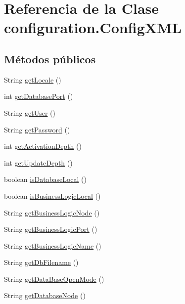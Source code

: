\hypertarget{classconfiguration_1_1_config_x_m_l}{}\section{Referencia de la Clase configuration.\+Config\+X\+ML}
\label{classconfiguration_1_1_config_x_m_l}
\subsection*{Métodos públicos}
\begin{DoxyCompactItemize}
\item 
String \mbox{\hyperlink{classconfiguration_1_1_config_x_m_l_a6b861b18eba822ef3a5130a1c3f410b2}{get\+Locale}} ()
\item 
int \mbox{\hyperlink{classconfiguration_1_1_config_x_m_l_abf4649caafdcfb0b506af7402f09728c}{get\+Database\+Port}} ()
\item 
String \mbox{\hyperlink{classconfiguration_1_1_config_x_m_l_a98e53bd841ca5f520af914f96ff2afef}{get\+User}} ()
\item 
String \mbox{\hyperlink{classconfiguration_1_1_config_x_m_l_a70146fb5f8cda65220413959691e3616}{get\+Password}} ()
\item 
int \mbox{\hyperlink{classconfiguration_1_1_config_x_m_l_afa4f081029d29faec64f93506dd5ee34}{get\+Activation\+Depth}} ()
\item 
int \mbox{\hyperlink{classconfiguration_1_1_config_x_m_l_a3c684aaee496a9aee2f57dcba57c70bf}{get\+Update\+Depth}} ()
\item 
boolean \mbox{\hyperlink{classconfiguration_1_1_config_x_m_l_a2ee9afbde36aa3f5c0d0158a8b5449fb}{is\+Database\+Local}} ()
\item 
boolean \mbox{\hyperlink{classconfiguration_1_1_config_x_m_l_a3055cd4f61151ef6d1c48a5ebf86b33f}{is\+Business\+Logic\+Local}} ()
\item 
String \mbox{\hyperlink{classconfiguration_1_1_config_x_m_l_a6a79b28dd9e0c1c755fef0e7435ec03a}{get\+Business\+Logic\+Node}} ()
\item 
String \mbox{\hyperlink{classconfiguration_1_1_config_x_m_l_a7e8cb431bc1e899176ae2891c007f7f3}{get\+Business\+Logic\+Port}} ()
\item 
String \mbox{\hyperlink{classconfiguration_1_1_config_x_m_l_ad6866b6aee38c74c082135f5dcd743ad}{get\+Business\+Logic\+Name}} ()
\item 
String \mbox{\hyperlink{classconfiguration_1_1_config_x_m_l_a403cc4242d937a87dfea24caabaf535d}{get\+Db\+Filename}} ()
\item 
String \mbox{\hyperlink{classconfiguration_1_1_config_x_m_l_a693787d7818204c9188cb0c03d9423a0}{get\+Data\+Base\+Open\+Mode}} ()
\item 
String \mbox{\hyperlink{classconfiguration_1_1_config_x_m_l_a622fdcb9a55b406b6bc2fa63509dae72}{get\+Database\+Node}} ()
\end{DoxyCompactItemize}
